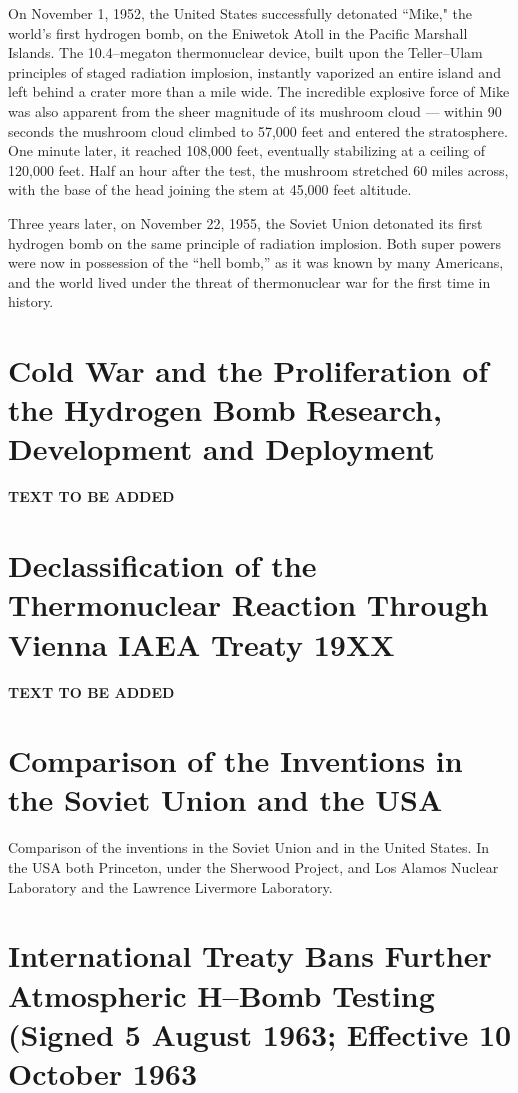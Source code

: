 \documentclass[a4paper,openany,12pt]{book}
\begin{document}
On November 1, 1952, the United States successfully detonated ``Mike," the world's first hydrogen bomb, on the Eniwetok Atoll in the Pacific Marshall Islands. The 10.4--megaton thermonuclear device, built upon the Teller--Ulam principles of staged radiation implosion, instantly vaporized an entire island and left behind a crater more than a mile wide. The incredible explosive force of Mike was also apparent from the sheer magnitude of its mushroom cloud --- within 90 seconds the mushroom cloud climbed to 57,000 feet and entered the stratosphere. One minute later, it reached 108,000 feet, eventually stabilizing at a ceiling of 120,000 feet. Half an hour after the test, the mushroom stretched 60 miles across, with the base of the head joining the stem at 45,000 feet altitude.

Three years later, on November 22, 1955, the Soviet Union detonated its first hydrogen bomb on the same principle of radiation implosion. Both super powers were now in possession of the ``hell bomb,'' as it was known by many Americans, and the world lived under the threat of thermonuclear war for the first time in history.

\section[Cold War and the Proliferation of the Hydrogen Bomb]{Cold War and the Proliferation of the Hydrogen Bomb Research, Development and Deployment}

\textbf{TEXT TO BE ADDED}

\section{Declassification of the Thermonuclear Reaction Through Vienna IAEA Treaty 19XX}

\textbf{TEXT TO BE ADDED}

\section{Comparison of the Inventions in the Soviet Union and the USA}

Comparison of the inventions in the Soviet Union and in the United States. In the USA both Princeton, under the Sherwood Project, and Los Alamos Nuclear Laboratory and the Lawrence Livermore Laboratory.

\section[International Treaty Bans Further Atmospheric H--Bomb Testing]{International Treaty Bans Further Atmospheric H--Bomb Testing (Signed 5 August 1963; Effective 10 October 1963}
\end{document}
